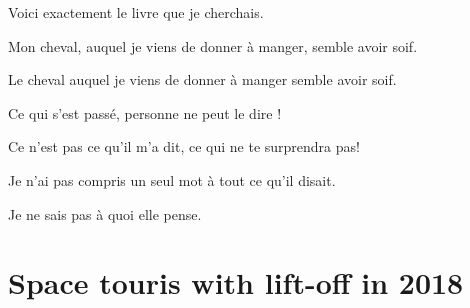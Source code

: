 \documentclass[a4paper,english,bookmarks]{article}
\begin{document}
\begin{enumerate}
\begin{minipage}{0.48\linewidth}
    	
    	\item Voici exactement le livre que je cherchais.
    	
    	
    	\item Mon cheval, auquel je viens de donner à manger, semble avoir soif.
    	
    	
    	\item Le cheval auquel je viens de donner à manger semble avoir soif.
    	
    	
	    \item Ce qui s'est passé, personne ne peut le dire !
	    
	    
	    \item Ce n'est pas ce qu'il m'a dit, ce qui ne te surprendra pas!
	    
	    
	    \item Je n'ai pas compris un seul mot à tout ce qu'il disait.
	    
    \end{minipage}
    
    \item Je ne sais pas à quoi elle pense.
	    
	
\end{enumerate}

\section{Space touris with lift-off in 2018}
\end{document}
